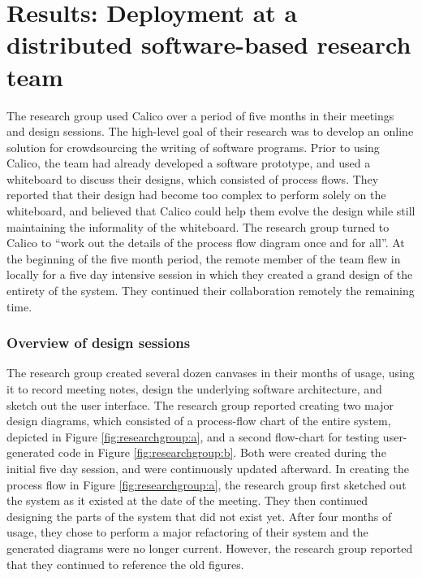 \documentclass[12pt,fleqn]{ucithesis}
\begin{document}
\section{Results: Deployment at a distributed software-based research team}
\label{chapter:evaluation:deployment3}

The research group used Calico over a period of five months in their meetings and design sessions. The high-level goal of their research was to develop an online solution for crowdsourcing the writing of software programs. Prior to using Calico, the team had already developed a software prototype, and used a whiteboard to discuss their designs, which consisted of process flows. They reported that their design had become too complex to perform solely on the whiteboard, and believed that Calico could help them evolve the design while still maintaining the informality of the whiteboard. The research group turned to Calico to ``work out the details of the process flow diagram once and for all''. At the beginning of the five month period, the remote member of the team flew in locally for a five day intensive session in which they created a grand design of the entirety of the system. They continued their collaboration remotely the remaining time. 

\subsubsection{Overview of design sessions}

The research group created several dozen canvases in their months of usage, using it to record meeting notes, design the underlying software architecture, and sketch out the user interface. The research group reported creating two major design diagrams, which consisted of a process-flow chart of the entire system, depicted in Figure \ref{fig:researchgroup:a}, and a second flow-chart for testing user-generated code in Figure \ref{fig:researchgroup:b}. Both were created during the initial five day session, and were continuously updated afterward. In creating the process flow in Figure \ref{fig:researchgroup:a}, the research group first sketched out the system as it existed at the date of the meeting. They then continued designing the parts of the system that did not exist yet. After four months of usage, they chose to perform a major refactoring of their system and the generated diagrams were no longer current. However, the research group reported that they continued to reference the old figures.
\end{document}
